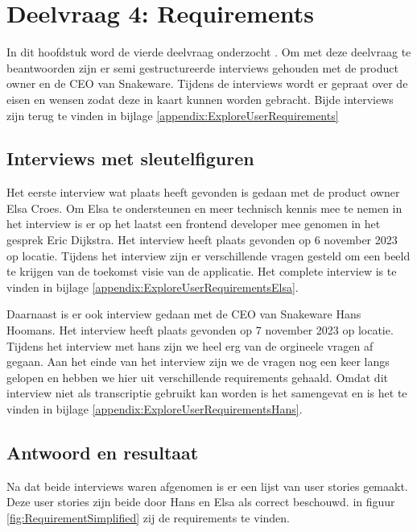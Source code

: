 \section{Deelvraag 4: Requirements}
In dit hoofdstuk word de vierde deelvraag onderzocht \SubquestionFour.
Om met deze deelvraag te beantwoorden zijn er semi gestructureerde interviews gehouden met de product owner en de CEO van Snakeware.
Tijdens de interviews wordt er gepraat over de eisen en wensen zodat deze in kaart kunnen worden gebracht.
Bijde interviews zijn terug te vinden in bijlage \ref{appendix:ExploreUserRequirements}

\subsection{Interviews met sleutelfiguren}
Het eerste interview wat plaats heeft gevonden is gedaan met de product owner Elsa Croes.
Om Elsa te ondersteunen en meer technisch kennis mee te nemen in het interview is er op het laatst een frontend developer mee genomen in het gesprek Eric Dijkstra.
Het interview heeft plaats gevonden op 6 november 2023 op locatie.
Tijdens het interview zijn er verschillende vragen gesteld om een beeld te krijgen van de toekomst visie van de applicatie.
Het complete interview is te vinden in bijlage \ref{appendix:ExploreUserRequirementsElsa}.

\whitespace
Daarnaast is er ook interview gedaan met de CEO van Snakeware Hans Hoomans.
Het interview heeft plaats gevonden op 7 november 2023 op locatie.
Tijdens het interview met hans zijn we heel erg van de orgineele vragen af gegaan. 
Aan het einde van het interview zijn we de vragen nog een keer langs gelopen en hebben we hier uit verschillende requirements gehaald.
Omdat dit interview niet als transcriptie gebruikt kan worden is het samengevat en is het te vinden in bijlage \ref{appendix:ExploreUserRequirementsHans}.

%

\subsection{Antwoord en resultaat}
Na dat beide interviews waren afgenomen is er een lijst van user stories gemaakt.
Deze user stories zijn beide door Hans en Elsa als correct beschouwd.
in figuur \ref{fig:RequirementSimplified} zij de requirements te vinden.

